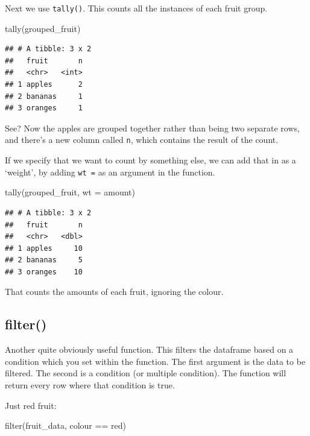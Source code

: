 \documentclass[
]{book}
\newenvironment{Shaded}{\begin{snugshade}}{\end{snugshade}}
\newcommand{\AttributeTok}[1]{\textcolor[rgb]{0.77,0.63,0.00}{#1}}
\newcommand{\FunctionTok}[1]{\textcolor[rgb]{0.00,0.00,0.00}{#1}}
\newcommand{\NormalTok}[1]{#1}
\newcommand{\SpecialCharTok}[1]{\textcolor[rgb]{0.00,0.00,0.00}{#1}}
\newcommand{\StringTok}[1]{\textcolor[rgb]{0.31,0.60,0.02}{#1}}
\begin{document}
Next we use \texttt{tally()}. This counts all the instances of each fruit group.

\begin{Shaded}
\begin{Highlighting}[]
\FunctionTok{tally}\NormalTok{(grouped\_fruit)}
\end{Highlighting}
\end{Shaded}

\begin{verbatim}
## # A tibble: 3 x 2
##   fruit       n
##   <chr>   <int>
## 1 apples      2
## 2 bananas     1
## 3 oranges     1
\end{verbatim}

See? Now the apples are grouped together rather than being two separate rows, and there's a new column called \texttt{n}, which contains the result of the count.

If we specify that we want to count by something else, we can add that in as a `weight', by adding \texttt{wt\ =} as an argument in the function.

\begin{Shaded}
\begin{Highlighting}[]
\FunctionTok{tally}\NormalTok{(grouped\_fruit, }\AttributeTok{wt =}\NormalTok{ amount)}
\end{Highlighting}
\end{Shaded}

\begin{verbatim}
## # A tibble: 3 x 2
##   fruit       n
##   <chr>   <dbl>
## 1 apples     10
## 2 bananas     5
## 3 oranges    10
\end{verbatim}

That counts the amounts of each fruit, ignoring the colour.

\hypertarget{filter}{%
\subsection{filter()}\label{filter}}

Another quite obviously useful function. This filters the dataframe based on a condition which you set within the function. The first argument is the data to be filtered. The second is a condition (or multiple condition). The function will return every row where that condition is true.

Just red fruit:

\begin{Shaded}
\begin{Highlighting}[]
\FunctionTok{filter}\NormalTok{(fruit\_data, colour }\SpecialCharTok{==} \StringTok{\textquotesingle{}red\textquotesingle{}}\NormalTok{)}
\end{Highlighting}
\end{Shaded}
\end{document}

